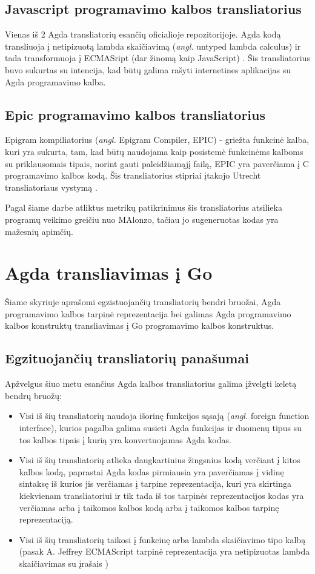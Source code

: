 \documentclass{VUMIFPSkursinis}
\begin{document}
\subsection{Javascript programavimo kalbos transliatorius}
Vienas iš 2 Agda transliatorių esančių oficialioje repozitorijoje. Agda kodą transliuoja į netipizuotą lambda skaičiavimą (\textit{angl.} untyped lambda calculus) ir tada transformuoja į ECMASript (dar žinomą kaip JavaScript) \cite{html_agda}. Šis transliatorius buvo sukurtas su intencija, kad būtų galima rašyti internetines aplikacijas su Agda programavimo kalba.
\subsection{Epic programavimo kalbos transliatorius}
Epigram kompiliatorius (\textit{angl.} Epigram Compiler, EPIC) - griežta funkcinė kalba, kuri yra sukurta, tam, kad būtų naudojama kaip posistemė funkcinėms kalboms su priklausomais tipais, norint gauti paleidžiamąjį failą, EPIC yra paverčiama į C programavimo kalbos kodą. Šis transliatorius stipriai įtakojo Utrecht transliatoriaus vystymą \cite{Utrecht}.\par Pagal šiame darbe atliktus metrikų patikrinimus šis transliatorius atsilieka programų veikimo greičiu nuo MAlonzo, tačiau jo sugeneruotas kodas yra mažesnių apimčių. 
\section{Agda transliavimas į Go}
Šiame skyriuje aprašomi egzistuojančių transliatorių bendri bruožai, Agda programavimo kalbos tarpinė reprezentacija bei galimas Agda programavimo kalbos konstruktų transliavimas į Go programavimo kalbos konstruktus.
\subsection{Egzituojančių transliatorių panašumai}
Apžvelgus šiuo metu esančius Agda kalbos transliatorius galima įžvelgti keletą bendrų bruožų:
\begin{itemize}
	\item Visi iš šių transliatorių naudoja išorinę funkcijos sąsają (\textit{angl.} foreign function interface), kurios pagalba galima susieti Agda funkcijas ir duomenų tipus su tos kalbos tipais į kurią yra konvertuojamas Agda kodas.
	\item Visi iš šių transliatorių atlieka daugkartinius žingsnius kodą verčiant į kitos kalbos kodą, paprastai Agda kodas pirmiausia yra paverčiamas į vidinę sintaksę iš kurios jis verčiamas į tarpine reprezentacija, kuri yra skirtinga kiekvienam transliatoriui ir tik tada iš tos tarpinės reprezentacijos kodas yra verčiamas arba į taikomos kalbos kodą arba į taikomos kalbos tarpinę reprezentaciją.
	\item Visi iš šių transliatorių taikosi į funkcinę arba lambda skaičiavimo tipo kalbą (pasak A. Jeffrey ECMAScript tarpinė reprezentacija yra netipizuotas lambda skaičiavimas su įrašais \cite{html_agda})
\end{itemize}
\end{document}
